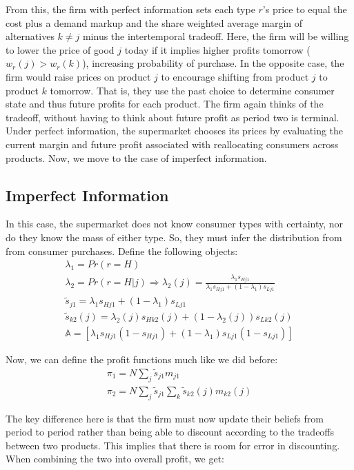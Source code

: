 \documentclass[11pt]{article}
\theoremstyle{definition}
\theoremstyle{remark}
\begin{document}
From this, the firm with perfect information sets each type $r$'s price to equal the cost plus a demand markup and the share weighted average margin of alternatives $k\ne j$ minus the intertemporal tradeoff. Here, the firm will be willing to lower the price of good $j$ today if it implies higher profits tomorrow ($w_r(j) > w_r(k)$), increasing probability of purchase. In the opposite case, the firm would raise prices on product $j$ to encourage shifting from product $j$ to product $k$ tomorrow. That is, they use the past choice to determine consumer state and thus future profits for each product.
The firm again thinks of the tradeoff, without having to think about future profit as period two is terminal. Under perfect information, the supermarket chooses its prices by evaluating the current margin and future profit associated with reallocating consumers across products. Now, we move to the case of imperfect information.

\subsection{Imperfect Information}

In this case, the supermarket does not know consumer types with certainty, nor do they know the mass of either type. So, they must infer the distribution from from consumer purchases. Define the following objects:
\begin{gather*}
  \lambda_1 = Pr(r = H) \\
  \lambda_2 = Pr(r=H|j) \Rightarrow \lambda_2(j) = \frac{\lambda_1s_{Hj1}}{\lambda_1s_{Hj1} + (1-\lambda_1)s_{Lj1}} \\
  \tilde{s}_{j1} = \lambda_1s_{Hj1} + (1-\lambda_1)s_{Lj1} \\
  \tilde{s}_{k2}(j) = \lambda_2(j)s_{Hk2}(j) + (1-\lambda_2(j))s_{Lk2}(j) \\
  \mathbb{A} = [\lambda_1s_{Hj1}(1-s_{Hj1}) + (1-\lambda_1)s_{Lj1}(1-s_{Lj1})]
\end{gather*}

Now, we can define the profit functions much like we did before:
\begin{gather*}
  \pi_1 = N\sum_j\tilde{s}_{j1}m_{j1} \\
  \pi_2 = N\sum_j\tilde{s}_{j1}\sum_k\tilde{s}_{k2}(j)m_{k2}(j)
\end{gather*}

The key difference here is that the firm must now update their beliefs from period to period rather than being able to discount according to the tradeoffs between two products. This implies that there is room for error in discounting. When combining the two into overall profit, we get:
\end{document}
